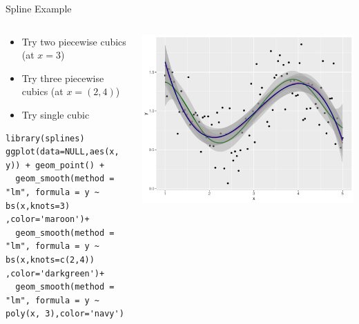 \documentclass[11pt,handout,xcolor=pdftex,dvipsnames,table,mathserif,aspectratio=169]{beamer}
\begin{document}
\begin{frame}[fragile]{Spline Example}
\begin{columns}
\begin{column}{0.5\textwidth}
\begin{itemize}
\item Try two piecewise cubics (at $x=3$)
\item Try three piecewise cubics (at $x=(2,4)$)
\item Try single cubic
\end{itemize}

 \tiny
 \vspace{2.4cm}
\begin{verbatim}
library(splines)
ggplot(data=NULL,aes(x, y)) + geom_point() + 
  geom_smooth(method = "lm", formula = y ~ bs(x,knots=3) ,color='maroon')+
  geom_smooth(method = "lm", formula = y ~ bs(x,knots=c(2,4)) ,color='darkgreen')+
  geom_smooth(method = "lm", formula = y ~ poly(x, 3),color='navy')
\end{verbatim}
\end{column}
\begin{column}{0.5\textwidth}  %
    \begin{center}
    \includegraphics[width=\textwidth]{./resources/splines.pdf}
     \end{center}
\end{column}
\end{columns}
\end{frame}
\end{document}
